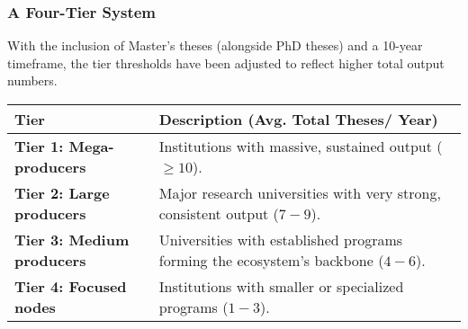 \documentclass[aspectratio=169]{beamer}
\begin{document}
\begin{frame}
    \frametitle{A Four-Tier System}
    
    With the inclusion of Master's theses (alongside PhD theses) and a 10-year timeframe, the tier thresholds have been adjusted to reflect higher total output numbers.

    \begin{center}
    \begin{tabularx}{0.9\textwidth}{l >{\RaggedRight}X}
        \toprule
        \textbf{Tier} & \textbf{Description (Avg. Total Theses/ Year)} \\
        \midrule
        \textbf{Tier 1: Mega-producers} & Institutions with massive, sustained output ($\geq 10$). \\
        \addlinespace
        \textbf{Tier 2: Large producers} & Major research universities with very strong, consistent output ($7-9$). \\
        \addlinespace
        \textbf{Tier 3: Medium producers} & Universities with established programs forming the ecosystem's backbone ($4-6$). \\
        \addlinespace
        \textbf{Tier 4: Focused nodes} & Institutions with smaller or specialized programs ($1-3$). \\
        \bottomrule
    \end{tabularx}
    \end{center}
\end{frame}
\end{document}
